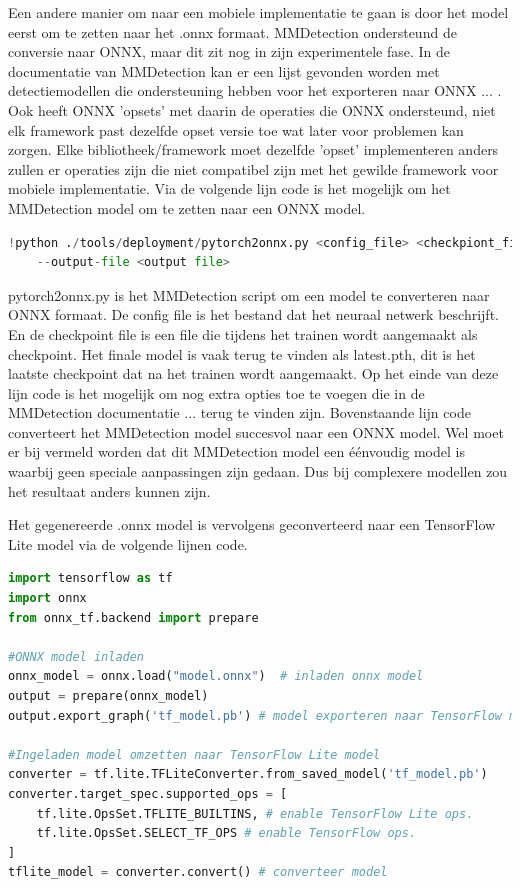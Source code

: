 Een andere manier om naar een mobiele implementatie te gaan is door het model eerst om te zetten naar het .onnx formaat.
MMDetection ondersteund de conversie naar ONNX, maar dit zit nog in zijn experimentele fase.
In de documentatie van MMDetection kan er een lijst gevonden worden met detectiemodellen die ondersteuning hebben voor het exporteren naar ONNX ... .
Ook heeft ONNX 'opsets' met daarin de operaties die ONNX ondersteund, niet elk framework past dezelfde opset versie toe wat later voor problemen kan zorgen.
Elke bibliotheek/framework moet dezelfde 'opset' implementeren anders zullen er operaties zijn die niet compatibel zijn met het gewilde framework voor mobiele implementatie.
Via de volgende lijn code is het mogelijk om het MMDetection model om te zetten naar een ONNX model.

\begin{lstlisting}[language=Python, caption=Converteren van MMDetection naar een onnx bestand]
!python ./tools/deployment/pytorch2onnx.py <config_file> <checkpiont_file> 
	--output-file <output file>
\end{lstlisting}

pytorch2onnx.py is het MMDetection script om een model te converteren naar ONNX formaat.
De config file is het bestand dat het neuraal netwerk beschrijft.
En de checkpoint file is een file die tijdens het trainen wordt aangemaakt als checkpoint.
Het finale model is vaak terug te vinden als latest.pth, dit is het laatste checkpoint dat na het trainen wordt aangemaakt.
Op het einde van deze lijn code is het mogelijk om nog extra opties toe te voegen die in de MMDetection documentatie ... terug te vinden zijn.
Bovenstaande lijn code converteert het MMDetection model succesvol naar een ONNX model.
Wel moet er bij vermeld worden dat dit MMDetection model een \'e\'envoudig model is waarbij geen speciale aanpassingen zijn gedaan.
Dus bij complexere modellen zou het resultaat anders kunnen zijn.

Het gegenereerde .onnx model is vervolgens geconverteerd naar een TensorFlow Lite model via de volgende lijnen code.

\begin{lstlisting}[language=Python, caption=Converteren van ONNX bestand naar een TensorFlow Lite model]
import tensorflow as tf
import onnx
from onnx_tf.backend import prepare
	
#ONNX model inladen 
onnx_model = onnx.load("model.onnx")  # inladen onnx model
output = prepare(onnx_model)
output.export_graph('tf_model.pb') # model exporteren naar TensorFlow model

#Ingeladen model omzetten naar TensorFlow Lite model
converter = tf.lite.TFLiteConverter.from_saved_model('tf_model.pb')
converter.target_spec.supported_ops = [
	tf.lite.OpsSet.TFLITE_BUILTINS, # enable TensorFlow Lite ops.
	tf.lite.OpsSet.SELECT_TF_OPS # enable TensorFlow ops.
]
tflite_model = converter.convert() # converteer model
\end{lstlisting}

